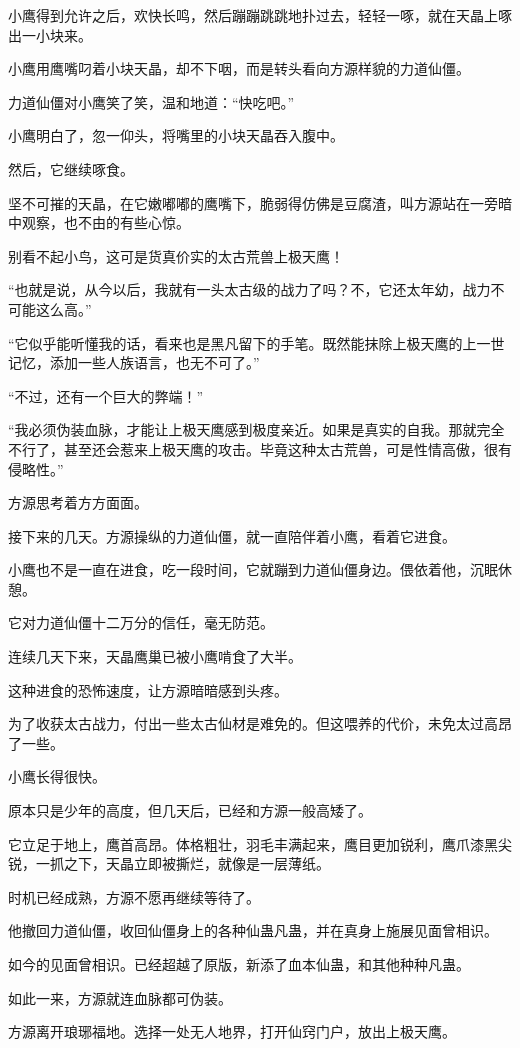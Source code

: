 \begin{this_body}
小鹰得到允许之后，欢快长鸣，然后蹦蹦跳跳地扑过去，轻轻一啄，就在天晶上啄出一小块来。

小鹰用鹰嘴叼着小块天晶，却不下咽，而是转头看向方源样貌的力道仙僵。

力道仙僵对小鹰笑了笑，温和地道：“快吃吧。”

小鹰明白了，忽一仰头，将嘴里的小块天晶吞入腹中。

然后，它继续啄食。

坚不可摧的天晶，在它嫩嘟嘟的鹰嘴下，脆弱得仿佛是豆腐渣，叫方源站在一旁暗中观察，也不由的有些心惊。

别看不起小鸟，这可是货真价实的太古荒兽上极天鹰！

“也就是说，从今以后，我就有一头太古级的战力了吗？不，它还太年幼，战力不可能这么高。”

“它似乎能听懂我的话，看来也是黑凡留下的手笔。既然能抹除上极天鹰的上一世记忆，添加一些人族语言，也无不可了。”

“不过，还有一个巨大的弊端！”

“我必须伪装血脉，才能让上极天鹰感到极度亲近。如果是真实的自我。那就完全不行了，甚至还会惹来上极天鹰的攻击。毕竟这种太古荒兽，可是性情高傲，很有侵略性。”

方源思考着方方面面。

接下来的几天。方源操纵的力道仙僵，就一直陪伴着小鹰，看着它进食。

小鹰也不是一直在进食，吃一段时间，它就蹦到力道仙僵身边。偎依着他，沉眠休憩。

它对力道仙僵十二万分的信任，毫无防范。

连续几天下来，天晶鹰巢已被小鹰啃食了大半。

这种进食的恐怖速度，让方源暗暗感到头疼。

为了收获太古战力，付出一些太古仙材是难免的。但这喂养的代价，未免太过高昂了一些。

小鹰长得很快。

原本只是少年的高度，但几天后，已经和方源一般高矮了。

它立足于地上，鹰首高昂。体格粗壮，羽毛丰满起来，鹰目更加锐利，鹰爪漆黑尖锐，一抓之下，天晶立即被撕烂，就像是一层薄纸。

时机已经成熟，方源不愿再继续等待了。

他撤回力道仙僵，收回仙僵身上的各种仙蛊凡蛊，并在真身上施展见面曾相识。

如今的见面曾相识。已经超越了原版，新添了血本仙蛊，和其他种种凡蛊。

如此一来，方源就连血脉都可伪装。

方源离开琅琊福地。选择一处无人地界，打开仙窍门户，放出上极天鹰。


\end{this_body}
